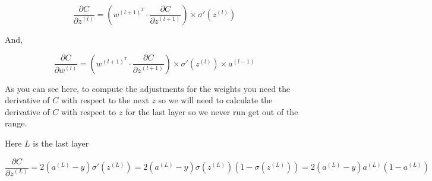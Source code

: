 \documentclass[]{report}
\begin{document}
\[\frac{\partial C}{\partial z^{(l)}}=\left(w^{(l+1)^{T}} \cdot \frac{\partial C}{\partial z^{(l+1)}} \right) \times \sigma\prime\left(z^{(l)}\right)\]

{And,}

\[\frac{\partial C}{\partial w^{(l)}}=\left(w^{(l+1)^{T}} \cdot \frac{\partial C}{\partial z^{(l+1)}} \right) \times \sigma\prime\left(z^{(l)}\right) \times a^{(l-1)}\]

{As you can see here, to compute the adjustments for the weights you need the derivative of $C$ with respect to the next $z$ so we will need to calculate the derivative of $C$ with respect to $z$ for the last layer so we never run get out of the range.}

{Here $L$ is the last layer}

\[\frac{\partial C}{\partial z^{(L)}}=2(a^{(L)}-y) \sigma\prime\left(z^{(L)}\right)=2(a^{(L)}-y)\sigma\left(z^{(L)}\right)\left(1-\sigma\left(z^{(L)}\right)\right)=2(a^{(L)}-y)a^{(L)}\left(1-a^{(L)}\right)\]
\end{document}
